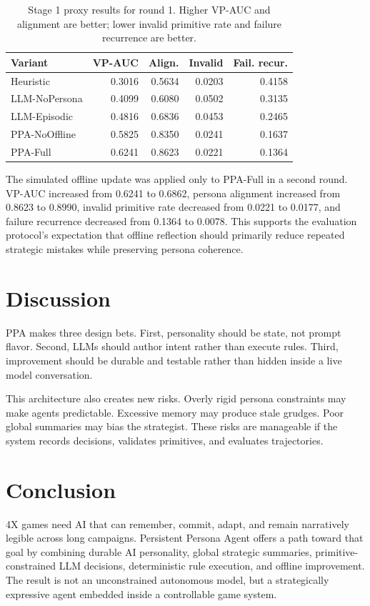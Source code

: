 \documentclass[10pt,twocolumn]{article}
\begin{document}
\begin{table}[t]
\centering
\begin{tabular}{lrrrr}
\toprule
Variant & VP-AUC & Align. & Invalid & Fail. recur. \\
\midrule
Heuristic & 0.3016 & 0.5634 & 0.0203 & 0.4158 \\
LLM-NoPersona & 0.4099 & 0.6080 & 0.0502 & 0.3135 \\
LLM-Episodic & 0.4816 & 0.6836 & 0.0453 & 0.2465 \\
PPA-NoOffline & 0.5825 & 0.8350 & 0.0241 & 0.1637 \\
PPA-Full & 0.6241 & 0.8623 & 0.0221 & 0.1364 \\
\bottomrule
\end{tabular}
\caption{Stage 1 proxy results for round 1. Higher VP-AUC and alignment are better; lower invalid primitive rate and failure recurrence are better.}
\end{table}

The simulated offline update was applied only to PPA-Full in a second round. VP-AUC increased from 0.6241 to 0.6862, persona alignment increased from 0.8623 to 0.8990, invalid primitive rate decreased from 0.0221 to 0.0177, and failure recurrence decreased from 0.1364 to 0.0078. This supports the evaluation protocol's expectation that offline reflection should primarily reduce repeated strategic mistakes while preserving persona coherence.

\section{Discussion}
PPA makes three design bets. First, personality should be state, not prompt flavor. Second, LLMs should author intent rather than execute rules. Third, improvement should be durable and testable rather than hidden inside a live model conversation.

This architecture also creates new risks. Overly rigid persona constraints may make agents predictable. Excessive memory may produce stale grudges. Poor global summaries may bias the strategist. These risks are manageable if the system records decisions, validates primitives, and evaluates trajectories.

\section{Conclusion}
4X games need AI that can remember, commit, adapt, and remain narratively legible across long campaigns. Persistent Persona Agent offers a path toward that goal by combining durable AI personality, global strategic summaries, primitive-constrained LLM decisions, deterministic rule execution, and offline improvement. The result is not an unconstrained autonomous model, but a strategically expressive agent embedded inside a controllable game system.



\end{document}
